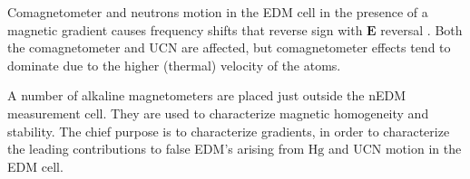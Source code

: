 
Comagnetometer and neutrons motion in the EDM cell in the presence of a magnetic gradient causes frequency shifts that reverse sign with $\bm{E}$ reversal \cite{comag_1,comag_2,comag_3}. Both the comagnetometer and UCN are affected, but comagnetometer effects tend to dominate due to the higher (thermal) velocity of the atoms. 

A number of alkaline magnetometers are placed just outside the
nEDM measurement cell. They are used to characterize magnetic homogeneity and stability. The chief purpose is to characterize gradients, in order to characterize the leading contributions to false EDM's arising from $\mathrm{Hg}$ and UCN motion in the EDM cell.




